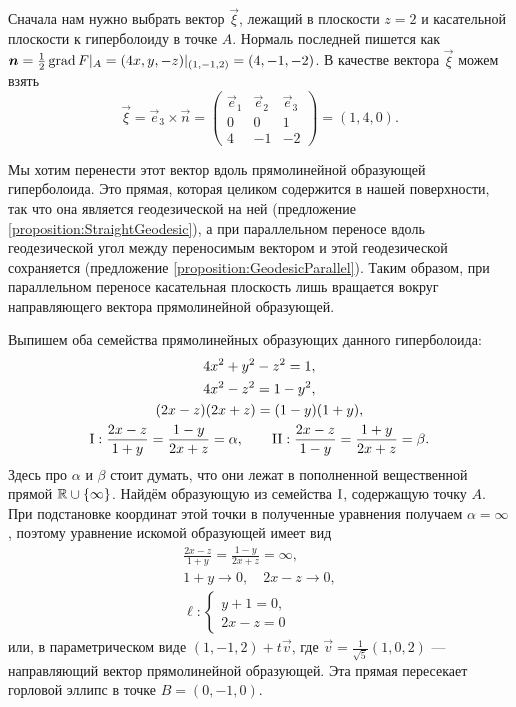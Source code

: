 \begin{solution}
	Сначала нам нужно выбрать вектор $\vec{\xi}$, лежащий в плоскости $z = 2$ и касательной плоскости к гиперболоиду в точке $A$. Нормаль последней пишется как $\vec{n} = \frac{1}{2}\grad F|_{A} \hm = (4x, y, -z)|_{(1, -1, 2)} = (4, -1, -2)$. В качестве вектора $\vec{\xi}$ можем взять
	\[
		\vec{\xi} = \vec{e}_3 \times \vec{n} =
		\begin{pmatrix}
			\vec{e}_1 & \vec{e}_2 & \vec{e}_3\\
			0 & 0 & 1\\
			4 & -1 & -2
		\end{pmatrix} = (1, 4, 0).
	\]

	Мы хотим перенести этот вектор вдоль прямолинейной образующей гиперболоида. Это прямая, которая целиком содержится в нашей поверхности, так что она является геодезической на ней (предложение \ref{proposition:StraightGeodesic}), а при параллельном переносе вдоль геодезической угол между переносимым вектором и этой геодезической сохраняется (предложение \ref{proposition:GeodesicParallel}). Таким образом, при параллельном переносе касательная плоскость лишь вращается вокруг направляющего вектора прямолинейной образующей.

	Выпишем оба семейства прямолинейных образующих данного гиперболоида:
	\begin{gather*}
		4x^2 + y^2 - z^2 = 1,\\
		4x^2 - z^2 = 1 - y^2,\\
		(2x - z)(2x + z) = (1 - y)(1 + y),\\
		\mathrm{\rnum{1}}: \frac{2x - z}{1 + y} = \frac{1 - y}{2x + z} = \alpha,\qquad\mathrm{\rnum{2}}: \frac{2x - z}{1 - y} = \frac{1 + y}{2x + z} = \beta.
	\end{gather*}
	Здесь про $\alpha$ и $\beta$ стоит думать, что они лежат в пополненной вещественной прямой $\mathbb{R} \cup \{\infty\}$. Найдём образующую из семейства $\mathrm{\rnum{1}}$, содержащую точку $A$. При подстановке координат этой точки в полученные уравнения получаем $\alpha = \infty$, поэтому уравнение искомой образующей имеет вид
	\begin{gather*}
		\frac{2x - z}{1 + y} = \frac{1 - y}{2x + z} = \infty,\\
		1 + y \to 0,\quad 2x - z \to 0,\\
		\ell\colon
		\begin{cases}
			y + 1 = 0,\\
			2x - z = 0
		\end{cases}
	\end{gather*}
	или, в параметрическом виде $(1, -1, 2) + t\vec{v}$, где $\vec{v} = \frac{1}{\sqrt{5}}(1, 0, 2)$ --- направляющий вектор прямолинейной образующей. Эта прямая пересекает горловой эллипс в точке $B = (0, -1, 0)$.


\end{solution}
